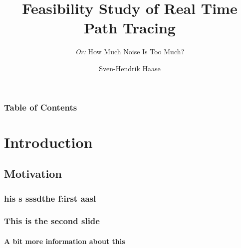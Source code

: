 \documentclass{beamer}
\title[Path Tracing]
{Feasibility Study of Real Time Path Tracing}
\subtitle{\textit{Or:} How Much Noise Is Too Much?}
\author[Haase]{Sven-Hendrik Haase}
\institute[University of Hamburg]{
    Department of Computer Science\\
    University of Hamburg
}
\begin{document}
\frame{\titlepage}
\begin{frame}
    \frametitle{Table of Contents}
    \tableofcontents
\end{frame}

\section{Introduction}
\subsection{Motivation}
\begin{frame}
    \frametitle{his s sssdthe f:irst aasl}
\end{frame}
\begin{frame}
    \frametitle{This is the second slide}
    \framesubtitle{A bit more information about this}
\end{frame}
\end{document}
